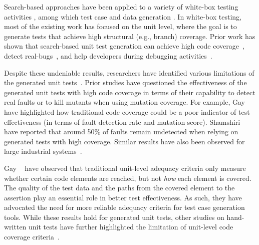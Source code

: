 


Search-based approaches have been applied to a variety of white-box testing activities \cite{Harman2012}, among which test case and data generation \cite{McMinn2004}. 
In white-box testing, most of the existing work has focused on the unit level, where the goal is to generate tests that achieve high structural (e.g., branch) coverage.
Prior work has shown that search-based unit test generation can achieve high code coverage~\cite{almasi2017industrial, Campos2017, Panichella2018a}, detect real-bugs~\cite{fraser20151600, Shamshiri2016}, and help developers during debugging activities~\cite{Ceccato2015, Panichella2016}.
 
Despite these undeniable results, researchers have identified various limitations of the generated unit tests~\cite{gay2015risks, Shamshiri2016, schwartz2018}. 
Prior studies have questioned the effectiveness of the generated unit tests with high code coverage in terms of their capability to detect real faults or to kill mutants when using mutation coverage. 
For example, Gay \etal~\cite{gay2015risks} have highlighted how traditional code coverage could be a poor indicator of test effectiveness (in terms of fault detection rate
 and mutation score). Shamshiri \etal~\cite{Shamshiri2016} have reported that around 50\% of faults remain undetected when relying on generated tests with high coverage. 
 Similar results have also been observed for large industrial systems~\cite{almasi2017industrial}. 

Gay \etal~\cite{gay2015risks} have observed that traditional unit-level adequacy criteria only measure whether certain code elements are reached, but not \textit{how} each element is 
covered. The quality of the test data and the paths from the covered element to the assertion play an essential role in better test effectiveness. As such, they have advocated the need 
for more reliable adequacy criteria for test case generation tools. While these results hold for generated unit tests, other studies on hand-written unit tests have further highlighted 
the limitation of unit-level code coverage criteria~\cite{wei2012branch, schwartz2018}.


